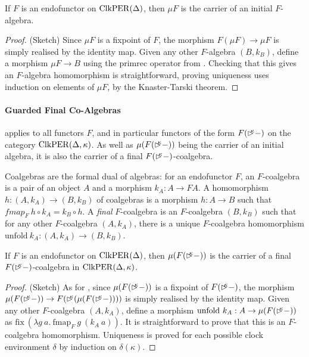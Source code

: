 \begin{theorem}\label{thm:initial-f-algebra}
  If $F$ is an endofunctor on $\mathrm{ClkPER}(\Delta)$, then $\mu F$ is the
  carrier of an initial $F$-algebra.
\end{theorem}

\begin{proof} (Sketch) Since $\mu F$ is a fixpoint of $F$, the
  morphism $F(\mu F) \to \mu F$ is simply realised by the identity
  map. Given any other $F$-algebra $(B,k_B)$, define a morphism $\mu F
  \to B$ using the $\mathrm{primrec}$ operator from
  . Checking that this gives an
  $F$-algebra homomorphism is straightforward, proving uniqueness uses
  induction on elements of $\mu F$, by the Knaster-Tarski theorem.
\end{proof}

\paragraph{Guarded Final Co-Algebras} 
applies to all functors $F$, and in particular functors of the form
$F(\mathord{\rhd\kern-0.4em^{\kappa}}-)$ on the category $\mathrm{ClkPER}(\Delta, \kappa)$. As well
as $\mu (F(\mathord{\rhd\kern-0.4em^{\kappa}} -))$ being the carrier of an initial algebra,
it is also the carrier of a final $F(\mathord{\rhd\kern-0.4em^{\kappa}}-)$-coalgebra.

Coalgebras are the formal dual of algebras: for an endofunctor $F$, an
$F$-coalgebra is a pair of an object $A$ and a morphism $k_A : A \to
FA$. A homomorphism $h : (A,k_A) \to (B,k_B)$ of coalgebras is a
morphism $h : A \to B$ such that $\mathit{fmap}_F~h \circ k_A =
k_B\circ h$. A \emph{final} $F$-coalgebra is an $F$-coalgebra
$(B,k_B)$ such that for any other $F$-coalgebra $(A,k_A)$, there is a
unique $F$-coalgebra homomorphism $\mathrm{unfold}~k_A : (A,k_A) \to
(B,k_B)$.

\begin{theorem}\label{thm:final-f-de-coalgebra}
  If $F$ is an endofunctor on $\mathrm{ClkPER}(\Delta)$, then $\mu
  (F(\mathord{\rhd\kern-0.4em^{\kappa}}-))$ is the carrier of a final
  $F(\mathord{\rhd\kern-0.4em^{\kappa}}-)$-coalgebra in $\mathrm{ClkPER}(\Delta,\kappa)$.
\end{theorem}

\begin{proof} (Sketch) As for , since
  $\mu (F(\mathord{\rhd\kern-0.4em^{\kappa}}-))$ is a fixpoint of $F(\mathord{\rhd\kern-0.4em^{\kappa}}-)$, the
  morphism $\mu (F(\mathord{\rhd\kern-0.4em^{\kappa}}-)) \to F(\mathord{\rhd\kern-0.4em^{\kappa}}(\mu (F(\mathord{\rhd\kern-0.4em^{\kappa}}-))))$ is simply realised by the identity
  map. Given any other $F$-coalgebra $(A,k_A)$, define a morphism
  $\mathrm{unfold}~k_A : A \to \mu(F(\mathord{\rhd\kern-0.4em^{\kappa}}-))$ as
  $\mathrm{fix}~(\lambda g~a.~\mathrm{fmap}_F~g~(k_A~a))$. It is
  straightforward to prove that this is an $F$-coalgebra
  homomorphism. Uniqueness is proved for each possible clock
  environment $\delta$ by induction on $\delta(\kappa)$.
\end{proof}

